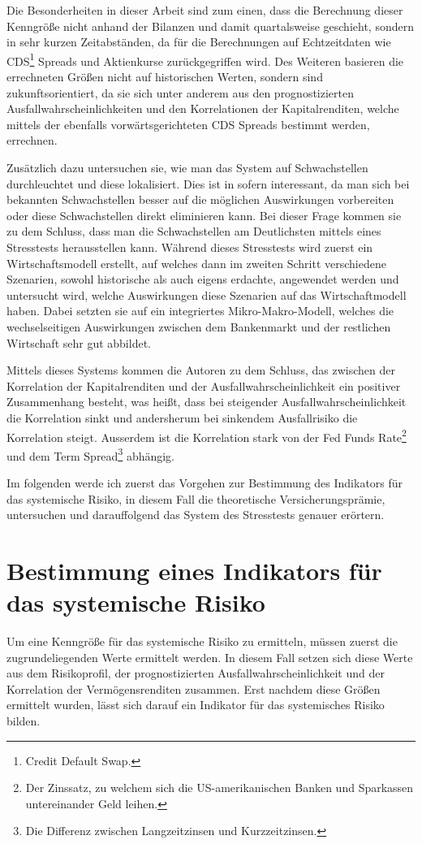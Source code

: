 \documentclass[a4paper,12pt]{scrartcl}
\begin{document}
Die Besonderheiten in dieser Arbeit sind zum einen, dass die Berechnung dieser Kenngröße nicht anhand der Bilanzen und damit quartalsweise geschieht, sondern in sehr kurzen Zeitabständen, da für die Berechnungen auf Echtzeitdaten wie CDS\footnote{Credit Default Swap.} Spreads und Aktienkurse zurückgegriffen wird. Des Weiteren basieren die errechneten Größen nicht auf historischen Werten, sondern sind zukunftsorientiert, da sie sich unter anderem aus den prognostizierten Ausfallwahrscheinlichkeiten und den Korrelationen der Kapitalrenditen, welche mittels der ebenfalls vorwärtsgerichteten CDS Spreads bestimmt werden, errechnen.

Zusätzlich dazu untersuchen sie, wie man das System auf Schwachstellen durchleuchtet und diese lokalisiert. Dies ist in sofern interessant, da man sich bei bekannten Schwachstellen besser auf die möglichen Auswirkungen vorbereiten  oder diese Schwachstellen direkt eliminieren kann. 
Bei dieser Frage kommen sie zu dem Schluss, dass man die Schwachstellen am Deutlichsten mittels eines Stresstests herausstellen kann. Während dieses Stresstests wird zuerst ein Wirtschaftsmodell erstellt, auf welches dann im zweiten Schritt verschiedene Szenarien, sowohl historische als auch eigens erdachte, angewendet werden und untersucht wird, welche Auswirkungen diese Szenarien auf das Wirtschaftmodell haben. Dabei setzten sie auf ein integriertes Mikro-Makro-Modell, welches die wechselseitigen Auswirkungen zwischen dem Bankenmarkt und der restlichen Wirtschaft sehr gut abbildet.

Mittels dieses Systems kommen die Autoren zu dem Schluss, das zwischen der Korrelation der Kapitalrenditen und der Ausfallwahrscheinlichkeit ein positiver Zusammenhang besteht, was heißt, dass bei steigender Ausfallwahrscheinlichkeit die Korrelation sinkt und andersherum bei sinkendem Ausfallrisiko die Korrelation steigt. Ausserdem ist die Korrelation stark von der Fed Funds Rate\footnote{Der Zinssatz, zu welchem sich die US-amerikanischen Banken und Sparkassen untereinander Geld leihen.} und dem Term Spread\footnote{Die Differenz zwischen Langzeitzinsen und Kurzzeitzinsen.} abhängig.

Im folgenden werde ich zuerst das Vorgehen zur Bestimmung des Indikators für das systemische Risiko, in diesem Fall die theoretische Versicherungsprämie, untersuchen und darauffolgend das System des Stresstests genauer erörtern.
\newpage

\section{Bestimmung eines Indikators für das systemische Risiko}
Um eine Kenngröße für das systemische Risiko zu ermitteln, müssen zuerst die zugrundeliegenden Werte ermittelt werden. In diesem Fall setzen sich diese Werte aus dem Risikoprofil, der prognostizierten Ausfallwahrscheinlichkeit und der Korrelation der Vermögensrenditen zusammen. Erst nachdem diese Größen ermittelt wurden, lässt sich darauf ein Indikator für das systemisches Risiko bilden.
\end{document}
